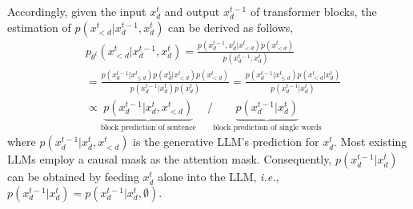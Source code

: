 Accordingly, given the input $x^{t}_d$ and output $x^{t-1}_d$ of transformer blocks, the estimation of $p(x^t_{<d}|x^{t-1}_d, x^{t}_d)$ can be derived as follows,
\begin{equation}
\begin{aligned}
& p_{\theta^t}(x^t_{<d}|x^{t-1}_d, x^t_d) = \frac{p(x^{t-1}_d, x^t_d|x^{t}_{<d})p(x^t_{<d})}{p(x^{t-1}_d, x^t_d)} \\
& = \frac{p(x^{t-1}_d|x^t_{\leq d})p(x^t_d|x^t_{<d})p(x^t_{<d})}{p(x^{t-1}_d|x^t_d)p(x^t_d)} 
= \frac{p(x^{t-1}_d|x^t_{\leq d})p(x^t_{<d}|x^t_d)}{p(x^{t-1}_d|x^t_d)} \\
&\propto {\underbrace{p(x^{t-1}_d|x^t_d, x^t_{<d})}_{\text{block prediction of sentence}}} \quad / {\underbrace{p(x^{t-1}_d|x^t_d)}_{\text{block prediction of single words}}}
\end{aligned}
\label{equ:diff}
\end{equation} where $p(x^{t-1}_d|x^t_d, x^t_{<d})$ is the generative LLM's prediction for $x^t_d$. Most existing LLMs employ a causal mask as the attention mask. Consequently, $p(x^{t-1}_d|x^t_d)$ can be obtained by feeding $x_d^t$ alone into the LLM, \emph{i.e.}, $p(x^{t-1}_d|x^t_d) = p(x^{t-1}_d|x^t_d, \emptyset)$. 


